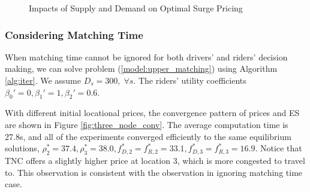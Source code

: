 \documentclass[review]{elsarticle}
\begin{document}
\begin{figure*}[htbp]
	\centering
	\vspace{-2em}
	\caption{Impacts of Supply and Demand on Optimal Surge Pricing}
	\label{fig:senstivity_price}
\end{figure*}

\subsubsection{Considering Matching Time}
When matching time cannot be ignored for both drivers' and riders' decision making, we can solve problem (\ref{model:upper_matching}) using Algorithm \ref{alg:iter}. We assume $D_s = 300, \; \forall s$. The riders' utility coefficients $\beta_0' = 0, \beta_1' =1, \beta_2' = 0.6$. 

With different initial locational prices, the convergence pattern of prices and ES are shown in Figure \ref{fig:three_node_conv}. The average computation time is 27.8s, and all of the experiments converged efficiently to the same equilibrium solutions, $\rho_2^* = 37.4, \rho_3^* = 38.0, f_{D,2}^*=f_{R,2}^* = 33.1, f_{D,3}^* = f_{R,3}^* = 16.9$. Notice that TNC offers a slightly higher price at location 3, which is more congested to travel to. This observation is consistent with the observation in ignoring matching time case. 
\end{document}
